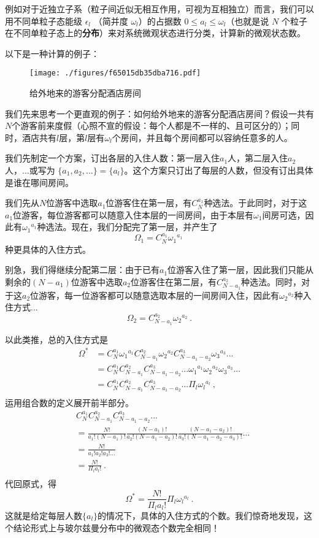 例如对于近独立子系（粒子间近似无相互作用，可视为互相独立）而言，我们可以用不同单粒子态能级 $\epsilon_l$ （简并度 $\omega_l$）的占据数 $0\le a_l\le \omega_l$（也就是说 $N$ 个粒子在不同单粒子态上的\textbf{分布}）来对系统微观状态进行分类，计算新的微观状态数。

以下是一种计算的例子：
\begin{example}{}
\begin{figure}[ht]
\centering
\texttt{[image: ./figures/f65015db35dba716.pdf]}
\caption{给外地来的游客分配酒店房间} \label{fig_entro2_1}
\end{figure}
我们先来思考一个更直观的例子：如何给外地来的游客分配酒店房间？假设一共有$N$个游客前来度假（心照不宣的假设：每个人都是不一样的、且可区分的）；同时，酒店共有$l$层，第$l$层有$\omega_l$个房间，并且每个房间都可以容纳任意多的人。

我们先制定一个方案，订出各层的入住人数：第一层入住$a_1$人，第二层入住$a_2$人，...或写为 $\{a_1,a_2,...\}=\{a_l\}$。这个方案只订出了每层的人数，但没有订出具体是谁在哪间房间。

我们先从$N$位游客中选取$a_1$位游客住在第一层，有$C_N^{a_1}$种选法。于此同时，对于这$a_1$位游客，每位游客都可以随意入住本层的一间房间，由于本层有$\omega_1$间房可选，因此有${\omega_1}^{a_1}$种选法。现在，我们分配完了第一层，并产生了
$$\Omega_1 = C_N^{a_1} {\omega_1}^{a_1}~$$
种更具体的入住方式。

别急，我们得继续分配第二层：由于已有$a_1$位游客入住了第一层，因此我们只能从剩余的$(N-a_1)$位游客中选取$a_2$位游客住在第二层，有$C_{N-a_1}^{a_2}$种选法。同时，对于这$a_2$位游客，每一位游客都可以随意选取本层的一间房间入住，因此有${\omega_2}^{a_2}$种入住方式...
$$\Omega_2 = C_{N-a_1}^{a_2} {\omega_2}^{a_2}~.$$

以此类推，总的入住方式是
$$
\begin{aligned}
\Omega^* &= C_N^{a_1} {\omega_1}^{a_1} C_{N-a_1}^{a_2} {\omega_2}^{a_2} C_{N-a_1-a_2}^{a_3} {\omega_3}^{a_3}...\\
&=C_N^{a_1} C_{N-a_1}^{a_2} C_{N-a_1-a_2}^{a_3} ... {\omega_1}^{a_1}{\omega_2}^{a_2}  {\omega_3}^{a_3}...\\
& = C_N^{a_1} C_{N-a_1}^{a_2} C_{N-a_1-a_2}^{a_3} ... \Pi_l{\omega_l}^{a_l}~,\\
\end{aligned}
$$
运用组合数的定义展开前半部分。
$$
\begin{aligned}
& C_N^{a_1} C_{N-a_1}^{a_2} C_{N-a_1-a_2}^{a_3} ...\\
&= \frac{N!}{a_1!(N-a_1)!} 
\frac{(N-a_1)!}{a_2!(N-a_1-a_2)!}
\frac{(N-a_1-a_2)!}{a_3!(N-a_1-a_2-a_3)!}
...\\
&=\frac{N!}{a_1!a_2!a_3!...} \\
&=\frac{N!}{\Pi_l a_l!} ~.\\
\end{aligned}
$$
代回原式，得
$$
\Omega^* = \frac{N!}{\Pi_l a_l!}  \Pi_l{\omega_l}^{a_l}~.
$$
这就是给定每层人数$\{a_l\}$的情况下，具体的入住方式的个数。我们惊奇地发现，这个结论形式上与玻尔兹曼分布中的微观态个数完全相同！


\end{example}
